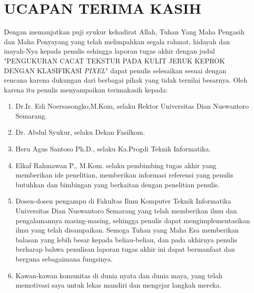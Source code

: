 \documentclass[laporan.tex]{subfiles}
\begin{document}
\chapter*{UCAPAN TERIMA KASIH}

Dengan memanjatkan puji syukur kehadirat Allah, Tuhan Yang Maha Pengasih dan Maha Penyayang yang telah melimpahkan segala rahmat, hidayah dan inayah-Nya kepada penulis sehingga laporan tugas akhir dengan judul "PENGUKURAN CACAT TEKSTUR PADA KULIT JERUK KEPROK DENGAN KLASIFIKASI \emph{PIXEL}" dapat penulis selesaikan sesuai dengan rencana karena dukungan dari berbagai pihak yang tidak ternilai besarnya. Oleh karena itu penulis menyampaikan terimakasih \mbox{kepada}:
\begin{enumerate}
\item Dr.Ir. Edi Noersasongko,M.Kom, selaku Rektor Universitas Dian Nuswantoro Semarang.
\item Dr. Abdul Syukur, selaku Dekan Fasilkom.
\item Heru Agus Santoso Ph.D., selaku Ka.Progdi Teknik Informatika.
\item Elkaf Rahmawan P., M.Kom. selaku pembimbing tugas akhir yang memberikan ide penelitian, memberikan informasi referensi yang penulis butuhkan dan bimbingan yang berkaitan dengan penelitian penulis.
\item Dosen-dosen pengampu di Fakultas Ilmu Komputer Teknik Informatika Universitas Dian Nuswantoro Semarang yang telah memberikan ilmu dan pengalamannya masing-masing, sehingga penulis dapat mengimplementasikan ilmu yang telah disampaikan. Semoga Tuhan yang Maha Esa memberikan balasan yang lebih besar kepada beliau-beliau, dan pada akhirnya penulis berharap bahwa penulisan laporan tugas akhir ini dapat bermanfaat dan berguna sebagaimana fungsinya.
\item Kawan-kawan komunitas di dunia nyata dan dunia maya, yang telah memotivasi saya untuk lekas mandiri dan mengejar langkah mereka.
\end{enumerate}
\end{document}
